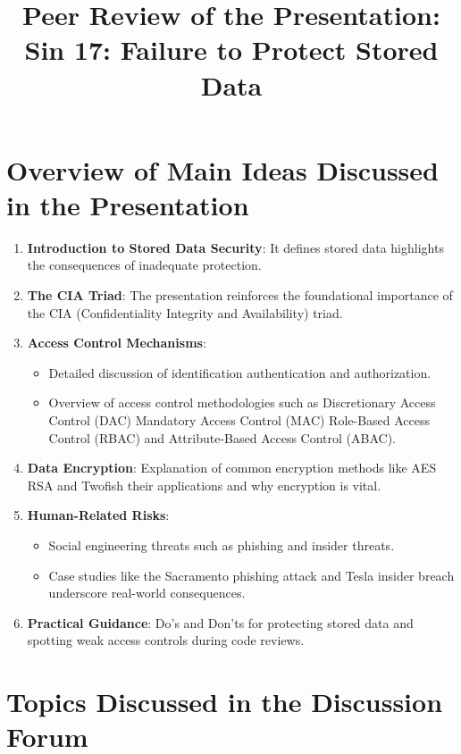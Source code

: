 \documentclass{article}
\title{Peer Review of the Presentation: Sin 17: Failure to Protect Stored Data}
\date{}
\begin{document}
\maketitle

\section*{Overview of Main Ideas Discussed in the Presentation}

\begin{enumerate}
    \item \textbf{Introduction to Stored Data Security}: It defines stored data highlights the consequences of inadequate protection.
    \item \textbf{The CIA Triad}: The presentation reinforces the foundational importance of the CIA (Confidentiality Integrity and Availability) triad.
    \item \textbf{Access Control Mechanisms}:
    \begin{itemize}
        \item Detailed discussion of identification authentication and authorization.
        \item Overview of access control methodologies such as Discretionary Access Control (DAC) Mandatory Access Control (MAC) Role-Based Access Control (RBAC) and Attribute-Based Access Control (ABAC).
    \end{itemize}
    \item \textbf{Data Encryption}: Explanation of common encryption methods like AES RSA and Twofish their applications and why encryption is vital.
    \item \textbf{Human-Related Risks}:
    \begin{itemize}
        \item Social engineering threats such as phishing and insider threats.
        \item Case studies like the Sacramento phishing attack and Tesla insider breach underscore real-world consequences.
    \end{itemize}
    \item \textbf{Practical Guidance}: Do’s and Don’ts for protecting stored data and spotting weak access controls during code reviews.
\end{enumerate}

\section*{Topics Discussed in the Discussion Forum}
\end{document}
